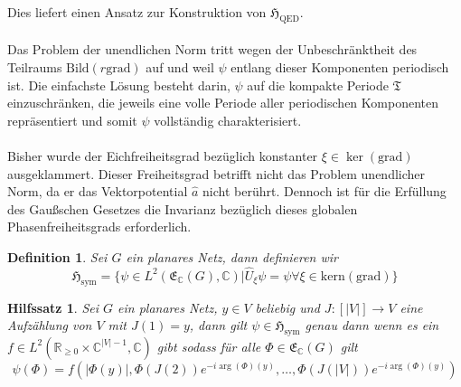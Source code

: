 \documentclass[11pt,a4paper,leqno]{report}
\newtheorem{lemma}[theorem]{Hilfssatz}
\newtheorem{definition}[theorem]{Definition}
\numberwithin{equation}{chapter}
\begin{document}
\noindent
Dies liefert einen Ansatz zur Konstruktion von $\mathfrak{H}_{\mathrm{QED}}$. \\
\\
 Das Problem der unendlichen Norm tritt wegen der Unbeschränktheit des Teilraums $\mathrm{Bild}(r\mathrm{grad})$ auf und weil $\psi$ entlang dieser Komponenten periodisch ist. Die einfachste Lösung besteht darin, $\psi$ auf die kompakte Periode $\mathfrak{T}$ einzuschränken, die jeweils eine volle Periode aller periodischen Komponenten repräsentiert und somit $\psi$ vollständig charakterisiert.\\
\\
Bisher wurde der Eichfreiheitsgrad bezüglich konstanter $\xi\in\ker(\mathrm{grad})$ 
ausgeklammert. Dieser Freiheitsgrad betrifft nicht das Problem unendlicher Norm, da er das 
Vektorpotential $\hat{a}$ nicht berührt. Dennoch ist für die Erfüllung des Gaußschen 
Gesetzes die Invarianz bezüglich dieses globalen Phasenfreiheitsgrads erforderlich.
\begin{definition}\label{def:symmetric_hilbert_space}
	Sei $G$ ein planares Netz, dann definieren wir
	\begin{equation}
		\mathfrak{H}_{\text{sym}}=\{\psi\in L^2(\mathfrak{E}_\mathbb{C}(G), \mathbb{C})| \hat{U}_\xi\psi=\psi \forall \xi\in \mathrm{kern}(\mathrm{grad})\}
	\end{equation}
\end{definition}
\begin{lemma}
	Sei $G$ ein planares Netz, $y\in V$ beliebig und $J:[|V|]\rightarrow V$ eine Aufzählung von $V$ mit $J(1)=y$, dann gilt $\psi\in \mathfrak{H}_{\text{sym}}$ genau dann wenn es ein $f\in L^2(	\mathbb{R}_{\geq0}\times\mathbb{C}^{|V|-1}, \mathbb{C})$ gibt sodass f\"ur alle $\Phi\in\mathfrak{E}_\mathbb{C}(G)$ gilt
	\begin{equation}
		\psi(\Phi) = f(|\Phi(y)|,\Phi(J(2))e^{-i\arg(\Phi)(y)},\dots,\Phi(J(|V|))e^{-i\arg(\Phi)(y)})\label{eq:symlink}
	\end{equation}
\end{lemma}
\end{document}
